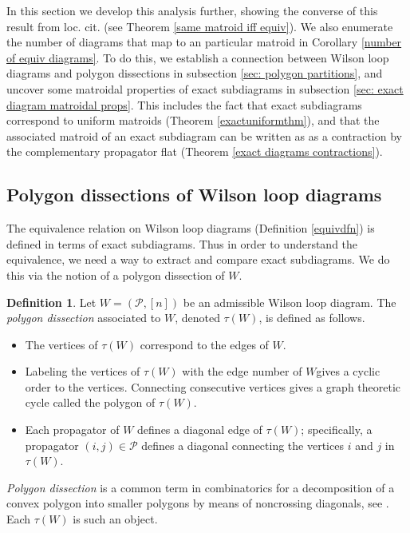 \documentclass[11pt]{article}
\newcommand{\cP}{\mathcal{P}}
\theoremstyle{remark}
\theoremstyle{definition}
\newtheorem{dfn}[thm]{Definition}
\begin{document}
In this section we develop this analysis further, showing the converse of this result from loc. cit. (see Theorem \ref{same matroid iff equiv}). We also enumerate the number of diagrams that map to an particular matroid in Corollary \ref{number of equiv diagrams}. To do this, we establish a connection between Wilson loop diagrams and polygon dissections in subsection \ref{sec: polygon partitions}, and uncover some matroidal properties of exact subdiagrams in subsection \ref{sec: exact diagram matroidal props}. This includes the fact that exact subdiagrams correspond to uniform matroids (Theorem \ref{exactuniformthm}), and that the associated matroid of an exact subdiagram can be written as as a contraction by the complementary propagator flat (Theorem \ref{exact diagrams contractions}).


\subsection{Polygon dissections of Wilson loop diagrams\label{sec: polygon partitions}}


The equivalence relation on Wilson loop diagrams (Definition \ref{equivdfn}) is defined in terms of exact subdiagrams. Thus in order to understand the equivalence, we need a way to extract and compare exact subdiagrams. We do this via the notion of a polygon dissection of $W$.

\begin{dfn}\label{WLDtriangulationdfn}
  Let $W = (\cP, [n])$ be an admissible Wilson loop diagram.  The \emph{polygon dissection} associated to $W$, denoted $\tau(W)$, is defined as follows.
  \begin{itemize}
  \item The vertices of $\tau(W)$ correspond to the edges of $W$.
  \item Labeling the vertices of $\tau(W)$ with the edge number of $W$gives a cyclic order to the vertices. Connecting consecutive vertices gives a graph theoretic cycle called the polygon of $\tau(W)$.
  \item Each propagator of $W$ defines a diagonal edge of $\tau(W)$; specifically,  a propagator $(i,j) \in \cP$ defines a diagonal connecting the vertices $i$ and $j$ in $\tau(W)$.
  \end{itemize}
\end{dfn}

\emph{Polygon dissection} is a common term in combinatorics for a decomposition of a convex polygon into smaller polygons by means of noncrossing diagonals, see \cite{PSpolygon}.  Each $\tau(W)$ is such an object.
\end{document}
